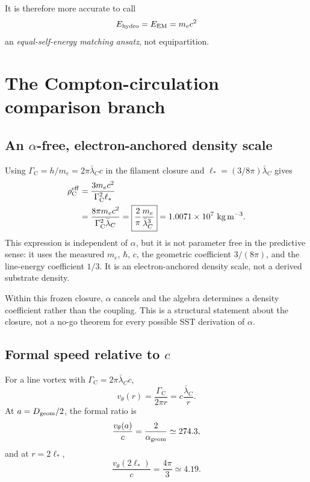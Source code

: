 \documentclass[aps,pre,preprint,notitlepage,nofootinbib,superscriptaddress]{revtex4-2}
\newcommand{\lC}{\bar\lambda_C}
\newcommand{\rhoCeff}{\rho_{\mathrm C}^{\mathrm{eff}}}
\newcommand{\GammaC}{\Gamma_{\mathrm C}}
\begin{document}
It is therefore more accurate to call
\[
E_{\rm hydro}=E_{\rm EM}=m_ec^2
\]
an \emph{equal-self-energy matching ansatz}, not equipartition.

\section{The Compton-circulation comparison branch}
\label{sec:compton-branch}

\subsection{An \texorpdfstring{\(\alpha\)-free}{alpha-free}, electron-anchored density scale}

Using \(\GammaC=h/m_e=2\pi\lC c\) in the filament closure and
\(\ell_*=(3/8\pi)\lC\) gives
\begin{align}
  \rhoCeff
  &=
  \frac{3m_ec^2}{\GammaC^2\ell_*}
  \notag\\
  &=
  \frac{8\pi m_ec^2}{\GammaC^2\lC}
  =
  \boxed{
  \frac{2}{\pi}\frac{m_e}{\lC^3}
  }
  =
  1.0071\times10^7\ \mathrm{kg\,m^{-3}}.
  \label{eq:rhoC}
\end{align}
This expression is independent of \(\alpha\), but it is not parameter free in the predictive sense: it uses the measured \(m_e\), \(\hbar\), \(c\), the geometric coefficient \(3/(8\pi)\), and the line-energy coefficient \(1/3\).  It is an electron-anchored density scale, not a derived substrate density.

Within this frozen closure, \(\alpha\) cancels and the algebra determines a density coefficient rather than the coupling.  This is a structural statement about the closure, not a no-go theorem for every possible SST derivation of \(\alpha\).

\subsection{\texorpdfstring{Formal speed relative to \(c\)}{Formal speed relative to c}}

For a line vortex with \(\GammaC=2\pi\lC c\),
\begin{equation}
  v_\theta(r)
  =
  \frac{\GammaC}{2\pi r}
  =
  c\frac{\lC}{r}.
  \label{eq:vGammaC}
\end{equation}
At \(a=D_{\rm geom}/2\), the formal ratio is
\[
\frac{v_\theta(a)}{c}
=
\frac{2}{\alpha_{\rm geom}}
\simeq274.3,
\]
and at \(r=2\ell_*\),
\[
\frac{v_\theta(2\ell_*)}{c}
=
\frac{4\pi}{3}
\simeq4.19.
\]
\end{document}
